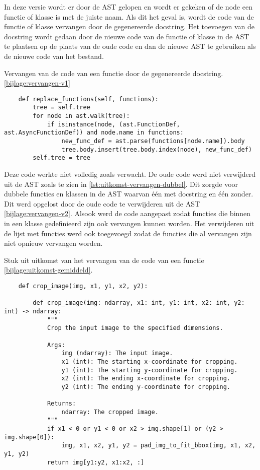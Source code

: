 In deze versie wordt er door de AST gelopen en wordt er gekeken of de node een functie of klasse is met de juiste naam. 
Als dit het geval is, wordt de code van de functie of klasse vervangen door de gegenereerde docstring.
Het toevoegen van de docstring wordt gedaan door de nieuwe code van de functie of klasse in de AST te plaatsen op de plaats van de oude code en dan de nieuwe AST te gebruiken als de nieuwe code van het bestand.

\begin{listing}
    \caption[Code voor het vervangen van een docstring]{Vervangen van de code van een functie door de gegenereerde docstring. \ref{bijlage:vervangen-v1}}
    \label{lst:vervangen-v1}
    \begin{verbatim}
    def replace_functions(self, functions):
        tree = self.tree
        for node in ast.walk(tree):
            if isinstance(node, (ast.FunctionDef, ast.AsyncFunctionDef)) and node.name in functions:
                new_func_def = ast.parse(functions[node.name]).body
                tree.body.insert(tree.body.index(node), new_func_def)        
        self.tree = tree

    \end{verbatim}
\end{listing}

Deze code werkte niet volledig zoals verwacht. De oude code werd niet verwijderd uit de AST zoals te zien in \ref{lst:uitkomst-vervangen-dubbel}. 
Dit zorgde voor dubbele functies en klassen in de AST waarvan één met docstring en één zonder. Dit werd opgelost door de oude code te verwijderen uit de AST \ref{bijlage:vervangen-v2}.
Alsook werd de code aangepast zodat functies die binnen in een klasse gedefinieerd zijn ook vervangen kunnen worden.
Het verwijderen uit de lijst met functies werd ook toegevoegd zodat de functies die al vervangen zijn niet opnieuw vervangen worden.

\begin{listing}
    \caption{Stuk uit uitkomst van het vervangen van de code van een functie \ref{bijlage:uitkomst-gemiddeld}.}
    \label{lst:uitkomst-vervangen-dubbel}
    \begin{verbatim}
    def crop_image(img, x1, y1, x2, y2):

        def crop_image(img: ndarray, x1: int, y1: int, x2: int, y2: int) -> ndarray:
            """
            Crop the input image to the specified dimensions.

            Args:
                img (ndarray): The input image.
                x1 (int): The starting x-coordinate for cropping.
                y1 (int): The starting y-coordinate for cropping.
                x2 (int): The ending x-coordinate for cropping.
                y2 (int): The ending y-coordinate for cropping.

            Returns:
                ndarray: The cropped image.
            """
            if x1 < 0 or y1 < 0 or x2 > img.shape[1] or (y2 > img.shape[0]):
                img, x1, x2, y1, y2 = pad_img_to_fit_bbox(img, x1, x2, y1, y2)
            return img[y1:y2, x1:x2, :]
    \end{verbatim}
\end{listing}

